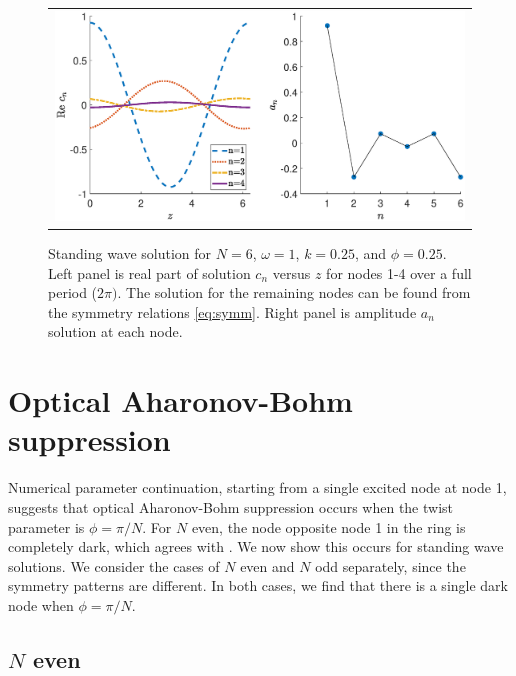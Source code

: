 \documentclass[12pt,reqno]{amsart}
\begin{document}
\begin{figure}[H]
\begin{center}
\begin{tabular}{c}
\includegraphics[width=15cm]{images/twist025.eps}
\end{tabular}
\end{center}
\caption{Standing wave solution for $N = 6$, $\omega = 1$, $k = 0.25$, and $\phi = 0.25$. Left panel is real part of solution $c_n$ versus $z$ for nodes 1-4 over a full period ($2 \pi)$. The solution for the remaining nodes can be found from the symmetry relations \cref{eq:symm}. Right panel is amplitude $a_n$ solution at each node.}
\label{fig:twist025}
\end{figure}

\section{Optical Aharonov-Bohm suppression}\label{sec:ABsupp}

Numerical parameter continuation, starting from a single excited node at node 1, suggests that optical Aharonov-Bohm suppression occurs when the twist parameter is $\phi = \pi/N$. For $N$ even, the node opposite node 1 in the ring is completely dark, which agrees with \cite{castro2016,Parto2017}. We now show this occurs for standing wave solutions. We consider the cases of $N$ even and $N$ odd separately, since the symmetry patterns are different. In both cases, we find that there is a single dark node when $\phi = \pi/N$.

\subsection{\texorpdfstring{$N$}{N} even}\label{sec:Neven}
\end{document}
